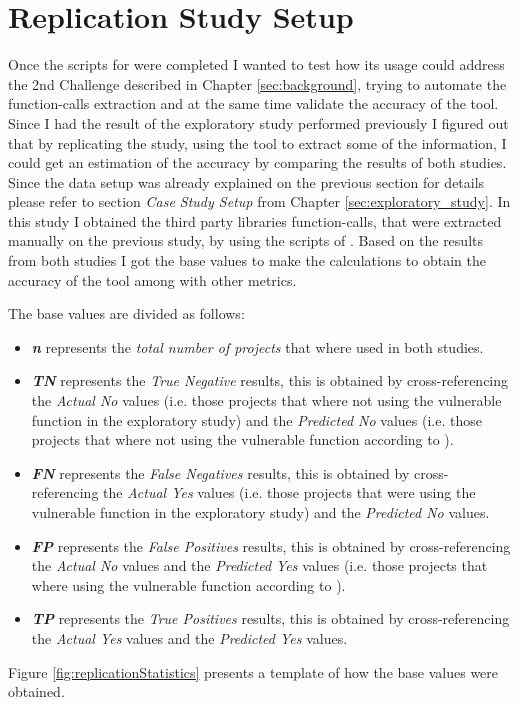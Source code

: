 \section{Replication Study Setup}
Once the scripts for \tool[] were completed I wanted to test how its usage could address the 2nd Challenge described in Chapter \ref{sec:background}, trying to automate the function-calls extraction and at the same time validate the accuracy of the tool. 
Since I had the result of the exploratory study performed previously I figured out that by replicating the study, using the tool to extract some of the information, I could get an estimation of the accuracy by comparing the results of both studies.
Since the data setup was already explained on the previous section for details please refer to section \textit{Case Study Setup} from Chapter \ref{sec:exploratory_study}.
In this study I obtained the third party libraries function-calls, that were extracted manually on the previous study, by using the scripts of \tool[]. Based on the results from both studies I got the base values to make the calculations to obtain the accuracy of the tool among with other metrics. 

The base values are divided as follows:
\begin{itemize}
    \item \textbf{\textit{n}} represents the \textit{total number of projects} that where used in both studies.
    \item \textbf{\textit{TN}} represents the \textit{True Negative} results, this is obtained by cross-referencing the \textit{Actual No} values (i.e. those projects that where not using the vulnerable function in the exploratory study) and the \textit{Predicted No} values (i.e. those projects that where not using the vulnerable function according to \tool[]). 
    \item \textbf{\textit{FN}} represents the \textit{False Negatives} results, this is obtained by cross-referencing the \textit{Actual Yes} values (i.e. those projects that were using the vulnerable function in the exploratory study) and the \textit{Predicted No} values. 
    \item \textbf{\textit{FP}} represents the \textit{False Positives} results, this is obtained by cross-referencing the \textit{Actual No} values and the \textit{Predicted Yes} values (i.e. those projects that where using the vulnerable function according to \tool[]).
    \item \textbf{\textit{TP}} represents the \textit{True Positives} results, this is obtained by cross-referencing the \textit{Actual Yes} values and the \textit{Predicted Yes} values.
\end{itemize}
Figure \ref{fig:replicationStatistics} presents a template of how the base values were obtained.

